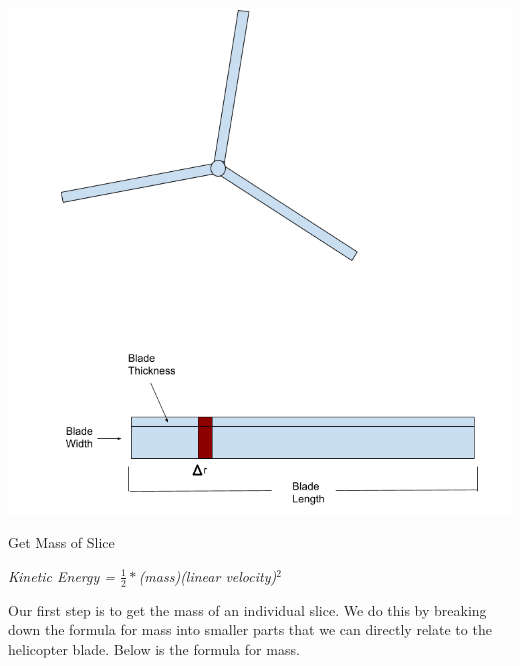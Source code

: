 \documentclass[a4paper, 11pt, oneside]{book} %
\begin{document}
\includegraphics[scale=0.34]{blade}\\
\vspace{0.5\baselineskip} %


{\LARGE Get Mass of Slice \\} %
\vspace{0.5\baselineskip} %
\vspace{0.5\baselineskip} %

\textit{Kinetic Energy = $\frac{1}{2}*$(mass)(linear velocity)$^2$}\\

\vspace{0.5\baselineskip} %
\vspace{0.5\baselineskip} %

Our first step is to get the mass of an individual slice. We do this by breaking down the formula for mass into smaller parts that we can directly relate to the helicopter blade. Below is the formula for mass.\\

\vspace{0.5\baselineskip} %
\vspace{0.5\baselineskip} %
\end{document}
